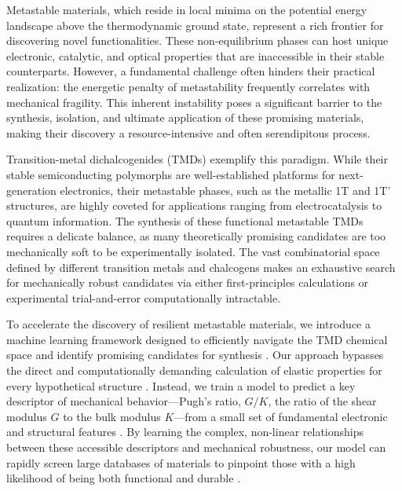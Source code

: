 \documentclass[]{article}
\begin{document}
Metastable materials, which reside in local minima on the potential energy landscape above the thermodynamic ground state, represent a rich frontier for discovering novel functionalities.\citep{Du_2025,Sun_2016} These non-equilibrium phases can host unique electronic, catalytic, and optical properties that are inaccessible in their stable counterparts.\citep{Du_2025} However, a fundamental challenge often hinders their practical realization: the energetic penalty of metastability frequently correlates with mechanical fragility.\citep{Du_2025,aykol2019thermodynamic} This inherent instability poses a significant barrier to the synthesis, isolation, and ultimate application of these promising materials, making their discovery a resource-intensive and often serendipitous process.\citep{Du_2025,aykol2019thermodynamic,Sun_2016}

Transition-metal dichalcogenides (TMDs) exemplify this paradigm. While their stable semiconducting polymorphs are well-established platforms for next-generation electronics, their metastable phases, such as the metallic 1T and 1T' structures, are highly coveted for applications ranging from electrocatalysis to quantum information.\citep{Kretschmer_2017,yin2024unraveling,Wang_2020,Lee_2020,Yin_2021,Demirkol_2022,Li_2026} The synthesis of these functional metastable TMDs requires a delicate balance, as many theoretically promising candidates are too mechanically soft to be experimentally isolated.\citep{yin2024unraveling,Demirkol_2022,Li_2026} The vast combinatorial space defined by different transition metals and chalcogens makes an exhaustive search for mechanically robust candidates via either first-principles calculations or experimental trial-and-error computationally intractable.\citep{hemmat2020quasibinary,Liu_2024,jaidka2026structurepropertyapplication}

To accelerate the discovery of resilient metastable materials, we introduce a machine learning framework designed to efficiently navigate the TMD chemical space and identify promising candidates for synthesis \citep{dejong2018statistical,Yuan_2025,Griesemer_2023,chen2021leveraginglargescalecomputationaldatabase,Tawfik_2022,Deng_2023,xin2025bridgingtheoryexperimentmaterials}. Our approach bypasses the direct and computationally demanding calculation of elastic properties for every hypothetical structure \citep{Yuan_2025,Jin_2023,Griesemer_2023}. Instead, we train a model to predict a key descriptor of mechanical behavior—Pugh's ratio, $G/K$, the ratio of the shear modulus $G$ to the bulk modulus $K$—from a small set of fundamental electronic and structural features \citep{dejong2018statistical,Jin_2023,stracke2025evaluatingmechanicalpropertyprediction,yue2023highthroughput}. By learning the complex, non-linear relationships between these accessible descriptors and mechanical robustness, our model can rapidly screen large databases of materials to pinpoint those with a high likelihood of being both functional and durable \citep{Deng_2023,Jin_2023,yue2023highthroughput,Griesemer_2023,chen2021leveraginglargescalecomputationaldatabase,dejong2018statistical}.
\end{document}
